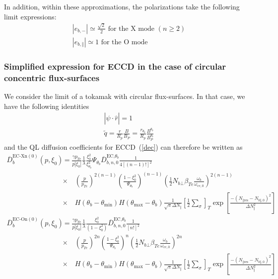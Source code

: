In addition, within these approximations, the polarizations take the following
limit expressions:%
\begin{gather}
\left|  e_{b,-}\right|  \simeq\frac{\sqrt{2}}{2}\text{ for the X mode }\left(
n\geq2\right)  \\
\left|  e_{b,\Vert}\right|  \simeq1\text{ for the O mode}%
\end{gather}

\subsubsection{Simplified expression for ECCD in the case of circular
concentric flux-surfaces}

We consider the limit of a tokamak with circular flux-surfaces. In that case,
we have the following identities
\begin{gather}
\left|  \widehat{\psi}\cdot\widehat{r}\right|  =1\\
\widetilde{q}=\frac{r}{R_{p}}\frac{B}{B_{P}}=\frac{r_{\theta_{b}}}{R_{p}}%
\frac{B^{\theta_{b}}}{B_{P}^{\theta_{b}}}%
\end{gather}
and the QL diffusion coefficients for ECCD\ (\ref{dec}) can therefore be
written as%
\begin{align}
\overline{D}_{b}^{\text{EC-Xn}(0)}(p,\xi_{0}) &  =\frac{\gamma p_{Te}%
}{p\left|  \xi_{0}\right|  }\frac{1}{\lambda}\frac{\xi_{0}^{2}}{\xi
_{\theta_{b}}^{2}}\Psi_{\theta_{b}}\overline{D}_{b,n,0}^{\text{EC,}\theta_{b}%
}\frac{1}{4\left[  \left(  n-1\right)  !\right]  ^{2}}\nonumber\\&\times\quad \left(  \frac{p}{p_{Te}%
}\right)  ^{2\left(  n-1\right)  }\left(
\frac{1-\xi_{0}^{2}}{\Psi _{\theta_{b}}}\right)  ^{\left(
n-1\right)  }\left(  \frac{1}{2}N_{b\bot
}\beta_{Te}\frac{\omega_{b}}{\omega_{ce,0}}\right)  ^{2\left(
n-1\right) }\nonumber\\&\times\quad   H\left(
\theta_{b}-\theta_{\min}\right)  H\left(  \theta_{\max}-\theta
_{b}\right)  \frac{1}{\sqrt{\pi}\Delta N_{\Vert}}\left[  \frac{1}{2}%
\sum\limits_{\sigma}\right]  _{T}\exp\left[  \frac{-\left(  N_{\Vert
\text{res}}-N_{b\Vert,0}\right)  ^{2}}{\Delta N_{\Vert}^{2}}\right]
\end{align}%
\begin{align}
\overline{D}_{b}^{\text{EC-On}(0)}(p,\xi_{0}) &  =\frac{\gamma p_{Te}%
}{p\left|  \xi_{0}\right|
}\frac{1}{\lambda}\frac{\xi_{0}^{2}}{\left( 1-\xi_{0}^{2}\right)
}\overline{D}_{b,n,0}^{\text{EC,}\theta_{b}}\frac {1}{\left[
n!\right]  ^{2}}\nonumber\\&\times\quad \left(
\frac{p}{p_{Te}}\right)  ^{2n}\left(
\frac{1-\xi_{0}^{2}}{\Psi_{\theta_{b}}}\right)  ^{n}\left(  \frac{1}%
{2}N_{b\bot}\beta_{Te}\frac{\omega_{b}}{\omega_{ce,0}}\right)  ^{2n}%
\nonumber\\&\times\quad  H\left( \theta_{b}-\theta_{\min}\right)
H\left(  \theta_{\max}-\theta
_{b}\right)  \frac{1}{\sqrt{\pi}\Delta N_{\Vert}}\left[  \frac{1}{2}%
\sum\limits_{\sigma}\right]  _{T}\exp\left[  \frac{-\left(  N_{\Vert
\text{res}}-N_{b\Vert,0}\right)  ^{2}}{\Delta N_{\Vert}^{2}}\right]
\end{align}
